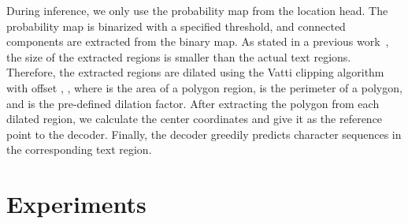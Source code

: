 \documentclass[10pt,twocolumn,letterpaper]{article}
\begin{document}
During inference, we only use the probability map from the location head. The probability map is binarized with a specified threshold, and connected components are extracted from the binary map. As stated in a previous work~\cite{liao2020real}, the size of the extracted regions is smaller than the actual text regions. Therefore, the extracted regions are dilated using the Vatti clipping algorithm with offset , ,
where  is the area of a polygon region,  is the perimeter of a polygon, and  is the pre-defined dilation factor. After extracting the polygon from each dilated region, we calculate the center coordinates and give it as the reference point to the decoder. Finally, the decoder greedily predicts character sequences in the corresponding text region.

 
\section{Experiments}
\end{document}
